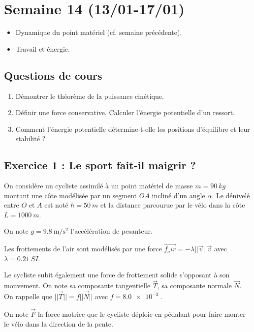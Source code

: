 \section{Semaine 14 (13/01-17/01) }


\begin{itemize}
	\item Dynamique du point matériel (cf. semaine précédente).
	\item Travail et énergie.
\end{itemize}

\subsection{Questions de cours}

\begin{enumerate}
	\item Démontrer le théorème de la puissance cinétique.
	\item Définir une force conservative. Calculer l'énergie potentielle d'un ressort.
	\item Comment l'énergie potentielle détermine-t-elle les positions d'équilibre et leur stabilité ?
\end{enumerate}

\subsection{Exercice 1 : Le sport fait-il maigrir ?}

On considère un cycliste assimilé à un point matériel de masse $m=\SI{90}{kg}$ montant une côte modélisée par un segment $OA$ incliné d'un angle $\alpha$. Le dénivelé entre $O$ et $A$ est noté $h = \SI{50}{m}$ et la distance parcourue par le vélo dans la côte $L=\SI{1000}{m}$.

On note $g=\SI{9.8}{\meter\per\second\squared}$ l'accélération de pesanteur.

Les frottements de l'air sont modélisés par une force $\overrightarrow{f_air} = -\lambda ||\vec{v}|| \vec{v}$ avec $\lambda = \SI{0.21}{SI}$.

Le cycliste subit également une force de frottement solide s'opposant à son mouvement. On note sa composante tangentielle $\vec{T}$, sa composante normale $\vec{N}$. On rappelle que $||\vec{T}|| = f ||\vec{N}||$ avec $f = \SI{8.0e-3}{}$.

On note $\vec{F}$ la force motrice que le cycliste déploie en pédalant pour faire monter le vélo dans la direction de la pente.

